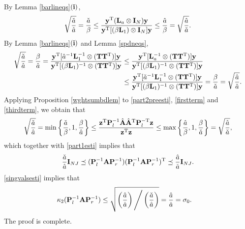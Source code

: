\documentclass[11pt]{article}%
\numberwithin{equation}{section}
\newenvironment{proof}{\noindent{\bf Proof:}}{\hfill\fbox{}\vspace*{1mm}}
\begin{document}
\begin{proof}
	By Lemma \ref{barlineqs}${\bf (i)}$,
	\begin{equation}\label{firstterm}
	\sqrt{\frac{\check{a}}{\hat{a}}}=\frac{\check{a}}{\beta}\leq\frac{{\bf y}^{\rm T}({\bf L}_a\otimes{\bf I}_N){\bf y}}{{\bf y}^{\rm T}[(\beta{\bf L}_{1})\otimes{\bf I}_N]{\bf y}}\leq\frac{\hat{a}}{\beta}=\sqrt{\frac{\hat{a}}{\check{a}}}.
	\end{equation}
	By Lemma \ref{barlineqs}${\bf (i)}$ and Lemma \ref{spdneqs},
	\begin{align}
	\sqrt{\frac{\check{a}}{\hat{a}}}=\frac{\beta}{\hat{a}}=\frac{{\bf y}^{\rm T}[\hat{a}^{-1}{\bf L}_{1}^{-1}\otimes({\bf T}{\bf T}^{\rm T})]{\bf y}}{{\bf y}^{\rm T}[(\beta{\bf L}_{1})^{-1}\otimes({\bf T}{\bf T}^{\rm T})]{\bf y}}&\leq\frac{{\bf y}^{\rm T}[{\bf L}_a^{-1}\otimes({\bf T}{\bf T}^{\rm T})]{\bf y}}{{\bf y}^{\rm T}[(\beta{\bf L}_{1})^{-1}\otimes({\bf T}{\bf T}^{\rm T})]{\bf y}}\notag\\
	&\leq\frac{{\bf y}^{\rm T}[\check{a}^{-1}{\bf L}_{1}^{-1}\otimes({\bf T}{\bf T}^{\rm T})]{\bf y}}{{\bf y}^{\rm T}[(\beta{\bf L}_{1})^{-1}\otimes({\bf T}{\bf T}^{\rm T})]{\bf y}}=\frac{\beta}{\check{a}}=\sqrt{\frac{\hat{a}}{\check{a}}}.\label{thirdterm}
	\end{align}
	Applying Proposition \ref{wghtsumbdlem} to \eqref{part2preesti}, \eqref{firstterm} and \eqref{thirdterm}, we obtain that
	\begin{equation*}
	\sqrt{\frac{\check{a}}{\hat{a}}}=\min\left\{\frac{\check{a}}{\beta},1,\frac{\beta}{\hat{a}}\right\}\leq\frac{{\bf z}^{\rm T}{\bf P}_l^{-1}\hat{\bf A}\hat{\bf A}^{\rm T}{\bf P}_l^{-\rm T}{\bf z}}{{\bf z}^{\rm T}{\bf z}}\leq\max\left\{\frac{\hat{a}}{\beta},1,\frac{\beta}{\check{a}}\right\}=\sqrt{\frac{\hat{a}}{\check{a}}},
	\end{equation*}
	which together with \eqref{part1esti} implies that
	\begin{equation}\label{singvalsesti}
	\frac{\check{a}}{\hat{a}}{\bf I}_{N J }\preceq({\bf P}_l^{-1}{\bf A}{\bf P}_r^{-1})({\bf P}_l^{-1}{\bf A}{\bf P}_r^{-1})^{\rm T}\preceq	\frac{\hat{a}}{\check{a}}{\bf I}_{N J }.
	\end{equation}
	\eqref{singvalsesti} implies that
	\begin{align*}
	\kappa_2({\bf P}_l^{-1}{\bf A}{\bf P}_r^{-1})&\leq\sqrt{	\left(\frac{\hat{a}}{\check{a}}\right)\Bigg/\left(\frac{\check{a}}{\hat{a}}\right)}=\frac{\hat{a}}{\check{a}}=\sigma_0.
	\end{align*}
	The proof is complete.
\end{proof}
\end{document}
